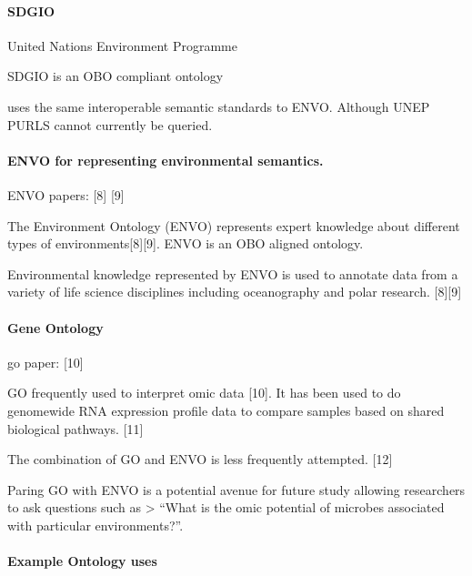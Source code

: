 \documentclass[]{article}
\let\oldparagraph\paragraph
\renewcommand{\paragraph}[1]{\oldparagraph{#1}\mbox{}}
\begin{document}
\hypertarget{sdgio}{%
\paragraph{SDGIO}\label{sdgio}}

United Nations Environment Programme

SDGIO is an OBO compliant ontology

uses the same interoperable semantic standards to ENVO. Although UNEP
PURLS cannot currently be queried.

\hypertarget{envo-for-representing-environmental-semantics.}{%
\paragraph{ENVO for representing environmental
semantics.}\label{envo-for-representing-environmental-semantics.}}

ENVO papers: {[}8{]} {[}9{]}

The Environment Ontology (ENVO) represents expert knowledge about
different types of environments{[}8{]}{[}9{]}. ENVO is an OBO aligned
ontology.

Environmental knowledge represented by ENVO is used to annotate data
from a variety of life science disciplines including oceanography and
polar research. {[}8{]}{[}9{]}

\hypertarget{gene-ontology}{%
\paragraph{Gene Ontology}\label{gene-ontology}}

go paper: {[}10{]}

GO frequently used to interpret omic data {[}10{]}. It has been used to
do genomewide RNA expression profile data to compare samples based on
shared biological pathways. {[}11{]}

The combination of GO and ENVO is less frequently attempted. {[}12{]}

Paring GO with ENVO is a potential avenue for future study allowing
researchers to ask questions such as \textgreater{} ``What is the omic
potential of microbes associated with particular environments?''.

\hypertarget{example-ontology-uses}{%
\paragraph{Example Ontology uses}\label{example-ontology-uses}}
\end{document}
